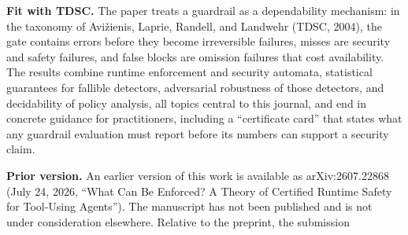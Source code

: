 \documentclass[11pt]{article}
\begin{document}
\textbf{Fit with TDSC.} The paper treats a guardrail as a dependability mechanism:
in the taxonomy of Avi\v{z}ienis, Laprie, Randell, and Landwehr (TDSC, 2004), the gate
contains errors before they become irreversible failures, misses are security and
safety failures, and false blocks are omission failures that cost availability. The
results combine runtime enforcement and security automata, statistical guarantees
for fallible detectors, adversarial robustness of those detectors, and decidability
of policy analysis, all topics central to this journal, and end in concrete
guidance for practitioners, including a ``certificate card'' that states what any
guardrail evaluation must report before its numbers can support a security claim.

\textbf{Prior version.} An earlier version of this work is available as
arXiv:2607.22868 (July 24, 2026, ``What Can Be Enforced? A Theory of Certified
Runtime Safety for Tool-Using Agents''). The manuscript has not been
published and is not under consideration elsewhere. Relative to the preprint, the
submission
\end{document}
